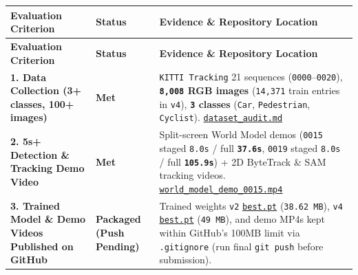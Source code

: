 \documentclass[10.5pt,a4paper]{article}
\begin{document}
\begin{footnotesize}
\setlength{\tabcolsep}{4pt}
\setlength{\LTleft}{0pt}\setlength{\LTright}{0pt}
\begin{longtable}{>{\raggedright\arraybackslash}p{} >{\raggedright\arraybackslash}p{} >{\raggedright\arraybackslash}p{}}
\toprule
\textbf{Evaluation Criterion} & \textbf{Status} & \textbf{Evidence \& Repository Location} \\
\midrule
\endfirsthead
\toprule
\textbf{Evaluation Criterion} & \textbf{Status} & \textbf{Evidence \& Repository Location} \\
\midrule
\endhead
\bottomrule
\endfoot
\textbf{1. Data Collection (3+ classes, 100+ images)} & \textbf{Met} & \texttt{KITTI Tracking} 21 sequences (\texttt{0000}--\texttt{0020}), \textbf{\texttt{8,\allowbreak{}008} RGB images} (\texttt{14,\allowbreak{}371} train entries in \texttt{v4}), \textbf{\texttt{3} classes} (\texttt{Car}, \texttt{Pedestrian}, \texttt{Cyclist}). \href{https://github.com/Heisnotanimposter/Totalcare\_autonomous\_driving\_Yolov5/blob/main/dataset\_audit.md}{\texttt{dataset\_\allowbreak{}audit.\allowbreak{}md}} \\
\textbf{2. 5s+ Detection \& Tracking Demo Video} & \textbf{Met} & Split-screen World Model demos (\texttt{0015} staged \texttt{8.\allowbreak{}0s} / full \textbf{\texttt{37.\allowbreak{}6s}}, \texttt{0019} staged \texttt{8.\allowbreak{}0s} / full \textbf{\texttt{105.\allowbreak{}9s}}) + 2D ByteTrack \& SAM tracking videos. \href{https://github.com/Heisnotanimposter/Totalcare\_autonomous\_driving\_Yolov5/blob/main/results/v4\_road\_lane/world\_outputs/v4\_world\_outputs/world\_model\_0015\_full/world\_model\_demo\_0015.mp4}{\texttt{world\_\allowbreak{}model\_\allowbreak{}demo\_\allowbreak{}0015.\allowbreak{}mp4}} \\
\textbf{3. Trained Model \& Demo Videos Published on GitHub} & \textbf{Packaged (Push Pending)} & Trained weights \texttt{v2} \href{https://github.com/Heisnotanimposter/Totalcare\_autonomous\_driving\_Yolov5/blob/main/results/v2\_improved/outputs/weights/best.pt}{\texttt{best.\allowbreak{}pt}} (\texttt{38.\allowbreak{}62 MB}), \texttt{v4} \href{https://github.com/Heisnotanimposter/Totalcare\_autonomous\_driving\_Yolov5/blob/main/results/v4\_road\_lane/detect\_outputs/outputs/weights/best.pt}{\texttt{best.\allowbreak{}pt}} (\texttt{49 MB}), and demo MP4s kept within GitHub's 100MB limit via \texttt{.\allowbreak{}gitignore} (run final \texttt{git push} before submission). \\

\end{longtable}
\end{footnotesize}
\end{document}
